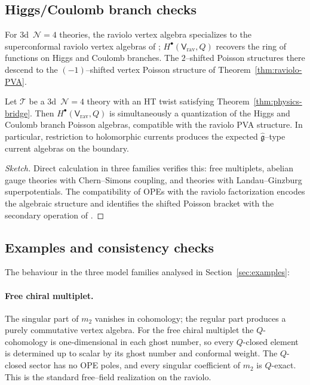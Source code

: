 \subsection{Higgs/Coulomb branch checks}
\label{subsec:Higgs-Coulomb}
For $3$d~$\mathcal N=4$ theories, the raviolo vertex algebra specializes to the
superconformal raviolo vertex algebras of
\cite{GRW21}; $H^\bullet(\mathsf V_{\mathrm{rav}},Q)$
recovers the ring of functions on Higgs and Coulomb branches.
The $2$–shifted Poisson structures there descend to the $(-1)$–shifted
vertex Poisson structure of Theorem~\ref{thm:raviolo-PVA}.
\begin{proposition}
\label{prop:Higgs-Coulomb-compat}
Let $\mathcal T$ be a $3$d~$\mathcal N=4$ theory with an HT twist satisfying Theorem~\ref{thm:physics-bridge}.
Then $H^\bullet(\mathsf V_{\mathrm{rav}},Q)$
is simultaneously a quantization of the Higgs and Coulomb branch Poisson algebras, compatible with the
raviolo PVA structure. In particular, restriction to holomorphic currents produces the
expected $\widehat{\mathfrak g}$–type current algebras on the boundary.
\end{proposition}
\begin{proof}[Sketch]
Direct calculation in three families verifies this:
free multiplets, abelian gauge theories with Chern–Simons coupling, and theories with Landau–Ginzburg
superpotentials. The compatibility of OPEs with the raviolo factorization encodes the algebraic structure and
identifies the shifted Poisson bracket with the secondary operation of \cite{OY20}.
\end{proof}
\subsection{Examples and consistency checks}
\label{subsec:raviolo-examples-2}
The behaviour in the three model families analysed in Section~\ref{sec:examples}:
\paragraph{\textbf{Free chiral multiplet.}}
The singular part of $m_2$ vanishes in cohomology; the regular part produces a purely commutative vertex algebra.
For the free chiral multiplet the $Q$-cohomology is one-dimensional in each ghost number, so every $Q$-closed element is determined up to scalar by its ghost number and conformal weight. The $Q$-closed sector has no OPE poles, and every singular coefficient of $m_2$ is $Q$-exact.
This is the standard free–field realization on the raviolo.
